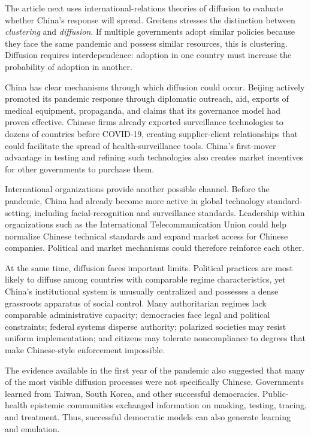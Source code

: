 The article next uses international-relations theories of diffusion to evaluate whether China's response will spread. Greitens stresses the distinction between \textit{clustering} and \textit{diffusion}. If multiple governments adopt similar policies because they face the same pandemic and possess similar resources, this is clustering. Diffusion requires interdependence: adoption in one country must increase the probability of adoption in another.

China has clear mechanisms through which diffusion could occur. Beijing actively promoted its pandemic response through diplomatic outreach, aid, exports of medical equipment, propaganda, and claims that its governance model had proven effective. Chinese firms already exported surveillance technologies to dozens of countries before COVID-19, creating supplier-client relationships that could facilitate the spread of health-surveillance tools. China's first-mover advantage in testing and refining such technologies also creates market incentives for other governments to purchase them.

International organizations provide another possible channel. Before the pandemic, China had already become more active in global technology standard-setting, including facial-recognition and surveillance standards. Leadership within organizations such as the International Telecommunication Union could help normalize Chinese technical standards and expand market access for Chinese companies. Political and market mechanisms could therefore reinforce each other.

At the same time, diffusion faces important limits. Political practices are most likely to diffuse among countries with comparable regime characteristics, yet China's institutional system is unusually centralized and possesses a dense grassroots apparatus of social control. Many authoritarian regimes lack comparable administrative capacity; democracies face legal and political constraints; federal systems disperse authority; polarized societies may resist uniform implementation; and citizens may tolerate noncompliance to degrees that make Chinese-style enforcement impossible.

The evidence available in the first year of the pandemic also suggested that many of the most visible diffusion processes were not specifically Chinese. Governments learned from Taiwan, South Korea, and other successful democracies. Public-health epistemic communities exchanged information on masking, testing, tracing, and treatment. Thus, successful democratic models can also generate learning and emulation.

